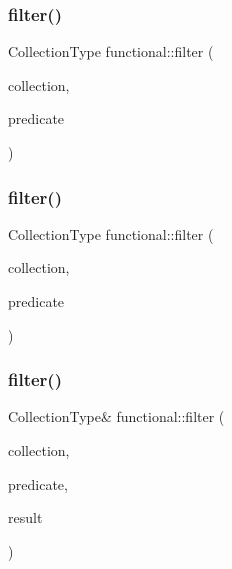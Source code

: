 \subsubsection{\texorpdfstring{filter()}{filter()}\hspace{0.1cm}{\footnotesize\ttfamily [1/4]}}
{\footnotesize\ttfamily Collection\+Type functional\+::filter (\begin{DoxyParamCaption}\item[{Collection\+Type}]{collection,  }\item[{bool($\ast$)(Element\+Type)}]{predicate }\end{DoxyParamCaption})}

\mbox{\label{namespacefunctional_a90c12ee7295b32ccf6bbffa3e71ae37b}} 
\subsubsection{\texorpdfstring{filter()}{filter()}\hspace{0.1cm}{\footnotesize\ttfamily [2/4]}}
{\footnotesize\ttfamily Collection\+Type functional\+::filter (\begin{DoxyParamCaption}\item[{Collection\+Type}]{collection,  }\item[{bool($\ast$)(const Element\+Type \&)}]{predicate }\end{DoxyParamCaption})}

\mbox{\label{namespacefunctional_a58614b761fe14f3d495a1ab30281650e}} 
\subsubsection{\texorpdfstring{filter()}{filter()}\hspace{0.1cm}{\footnotesize\ttfamily [3/4]}}
{\footnotesize\ttfamily Collection\+Type\& functional\+::filter (\begin{DoxyParamCaption}\item[{Collection\+Type}]{collection,  }\item[{bool($\ast$)(Element\+Type)}]{predicate,  }\item[{Collection\+Type \&}]{result }\end{DoxyParamCaption})}

